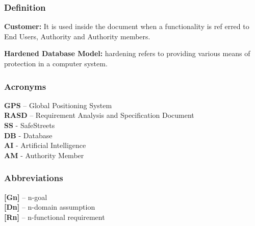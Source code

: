 \documentclass[12pt]{article}
\begin{document}
\subsubsection{Definition}
\vspace{2mm}
\begin{flushleft}

\textbf{Customer:} It is used inside the document when a functionality is ref
erred to End Users, Authority and Authority members.
\vspace{2mm}

\textbf{Hardened Database Model:} hardening refers to providing various means of protection in a computer system. 

\end{flushleft}

\subsubsection{Acronyms}
\vspace{2mm}
\begin{flushleft}

\textbf{GPS} – Global Positioning System
\vspace{2mm}\\

\textbf{RASD} – Requirement Analysis and Specification Document 
\vspace{2mm}\\


\textbf{SS} - SafeStreets
\vspace{2mm}\\


\textbf{DB} - Database
\vspace{2mm}\\


\textbf{AI} - Artificial Intelligence
\vspace{2mm}\\

\textbf{AM} - Authority Member
\end{flushleft}


\subsubsection{Abbreviations}
\vspace{2mm}
\begin{flushleft}

\textbf{[Gn]} – n-goal 
\vspace{2mm}\\
\textbf{[Dn]} – n-domain assumption 
\vspace{2mm}\\
\textbf{[Rn]} – n-functional requirement 
\vspace{2mm}\\

\end{flushleft}
\newpage
\end{document}
